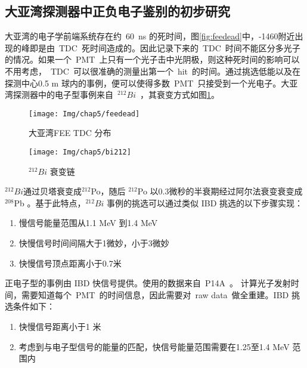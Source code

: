 \subsection{大亚湾探测器中正负电子鉴别的初步研究}
大亚湾的电子学前端系统存在约~60~ns 的死时间，图\ref{fig:feedead}中，-1460附近出现的峰即是由~TDC~死时间造成的。因此记录下来的~TDC~时间不能区分多光子的情况。如果一个~PMT~上只有一个光子击中光阴极，则这种死时间的影响可以不用考虑，~TDC~可以很准确的测量出第一个~hit~的时间。通过挑选低能以及在探测中心0.5 m 球内的事例，便可以使得多数~PMT~只接受到一个光电子。大亚湾探测器中的电子型事例来自~$^{212}Bi$~，其衰变方式如图\ref{fig:bi212}。
\begin{figure}[!htbp]
\begin{minipage}[t]{0.48\linewidth}
    \centering
    \texttt{[image: Img/chap5/feedead]}
    \caption{大亚湾FEE TDC 分布}
    \label{fig:feedead}
\end{minipage}
\quad\quad
\begin{minipage}[t]{0.48\linewidth}
    \centering
    \texttt{[image: Img/chap5/bi212]}
    \caption{$^{212}Bi$ 衰变链}
    \label{fig:bi212}
\end{minipage}
\end{figure}
$^{212}Bi$通过贝塔衰变成$^{212}$Po，随后 $^{212}$Po 以0.3微秒的半衰期经过阿尔法衰变衰变成$^{208}$Pb 。基于此特点，$^{212}Bi$ 事例的挑选可以通过类似 IBD 挑选的以下步骤实现：
\begin{enumerate}
\item 慢信号能量范围从1.1 MeV 到1.4 MeV
\item 快慢信号时间间隔大于1微妙，小于3微妙
\item 快慢信号顶点距离小于0.7米
\end{enumerate}
正电子型的事例由 IBD 快信号提供。使用的数据来自~P14A~。 计算光子发射时间，需要知道每个~PMT~的时间信息，因此需要对~raw data~做全重建。IBD 挑选条件如下：
\begin{enumerate}
\item 快慢信号距离小于1 米
\item 考虑到与电子型信号的能量的匹配，快信号能量范围需要在1.25至1.4 MeV 范围内
\end{enumerate}
